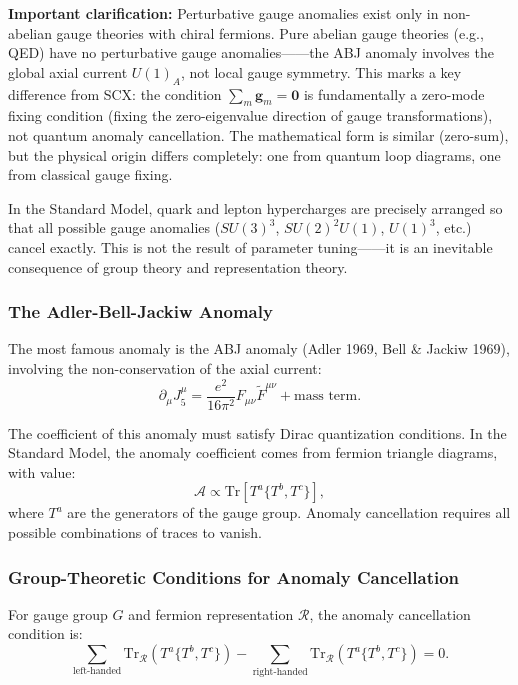 \documentclass[12pt,a4paper]{article}
\theoremstyle{remark}
\newcommand{\Tr}{\mathrm{Tr}}
\newcommand{\gaugeparam}{\mathbf{g}}
\begin{document}
\textbf{Important clarification:} Perturbative gauge anomalies exist only in
non-abelian gauge theories with chiral fermions. Pure abelian gauge theories (e.g., QED)
have no perturbative gauge anomalies——the ABJ anomaly involves the global
axial current $U(1)_A$, not local gauge symmetry. This marks a key difference from SCX:
the condition $\sum_m \gaugeparam_m = \mathbf{0}$ is fundamentally a zero-mode fixing
condition (fixing the zero-eigenvalue direction of gauge transformations), not
quantum anomaly cancellation. The mathematical form is similar (zero-sum), but the
physical origin differs completely: one from quantum loop diagrams, one from classical
gauge fixing.

In the Standard Model, quark and lepton hypercharges are precisely
arranged so that all possible gauge anomalies ($SU(3)^3$, $SU(2)^2U(1)$, $U(1)^3$, etc.) cancel exactly.
This is not the result of parameter tuning——it is an inevitable consequence of group theory and representation theory.

\subsubsection{The Adler-Bell-Jackiw Anomaly}

The most famous anomaly is the ABJ anomaly (Adler 1969, Bell \& Jackiw 1969),
involving the non-conservation of the axial current:
\begin{equation}
    \partial_\mu J_5^\mu = \frac{e^2}{16\pi^2} F_{\mu\nu}\tilde{F}^{\mu\nu} +
    \text{mass term}.
\end{equation}

The coefficient of this anomaly must satisfy Dirac quantization conditions. In the Standard Model,
the anomaly coefficient comes from fermion triangle diagrams, with value:
\begin{equation}
    \mathcal{A} \propto \Tr[T^a\{T^b, T^c\}],
\end{equation}
where $T^a$ are the generators of the gauge group. Anomaly cancellation requires all possible combinations of traces to vanish.

\subsubsection{Group-Theoretic Conditions for Anomaly Cancellation}

For gauge group $G$ and fermion representation $\mathcal{R}$, the anomaly cancellation condition is:
\begin{equation}
    \sum_{\text{left-handed}} \Tr_{\mathcal{R}}(T^a\{T^b, T^c\}) -
    \sum_{\text{right-handed}} \Tr_{\mathcal{R}}(T^a\{T^b, T^c\}) = 0.
\end{equation}
\end{document}
